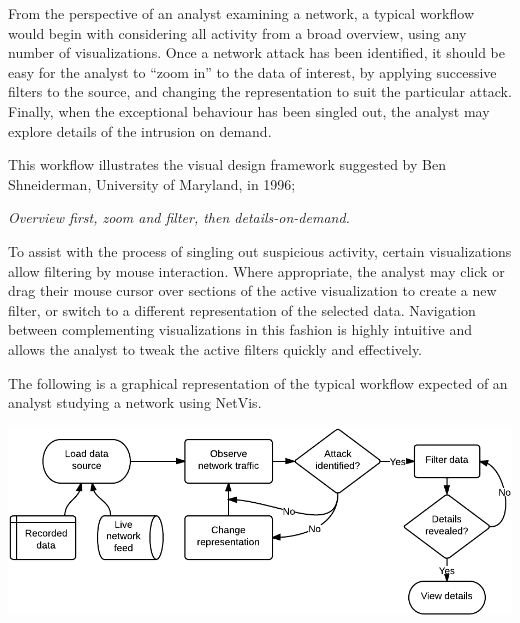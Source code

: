 From the perspective of an analyst examining a network, a typical workflow
would begin with considering all activity from a broad overview, using any
number of visualizations. Once a network attack has been identified, it should
be easy for the analyst to ``zoom in'' to the data of interest, by applying
successive filters to the source, and changing the representation to suit the
particular attack. Finally, when the exceptional behaviour has been singled
out, the analyst may explore details of the intrusion on demand.

This workflow illustrates the visual design framework suggested by Ben
Shneiderman, University of Maryland, in 1996;

\begin{center}
    \textit{Overview first, zoom and filter, then details-on-demand.}
\end{center}

To assist with the process of singling out suspicious activity, certain
visualizations allow filtering by mouse interaction. Where appropriate, the
analyst may click or drag their mouse cursor over sections of the active
visualization to create a new filter, or switch to a different representation
of the selected data. Navigation between complementing visualizations in this
fashion is highly intuitive and allows the analyst to tweak the active filters
quickly and effectively.

The following is a graphical representation of the typical workflow expected of
an analyst studying a network using NetVis.

\includegraphics[width=\linewidth]{materials/workflow-diagram.png}
